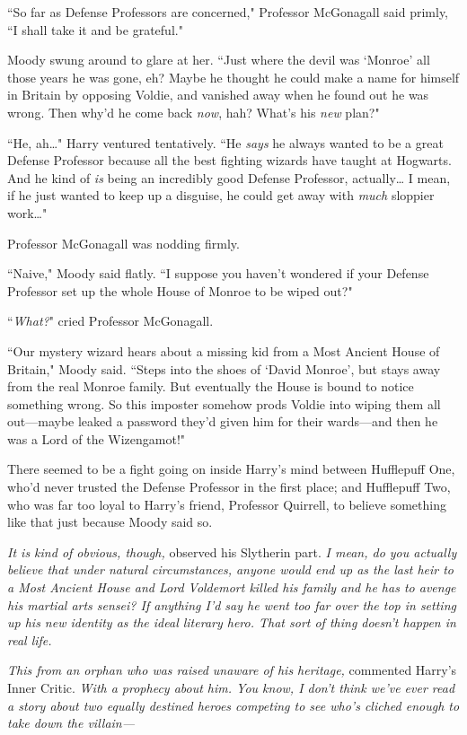 ``So far as Defense Professors are concerned," Professor McGonagall said primly, ``I shall take it and be grateful."

Moody swung around to glare at her. ``Just where the devil was `Monroe' all those years he was gone, eh? Maybe he thought he could make a name for himself in Britain by opposing Voldie, and vanished away when he found out he was wrong. Then why'd he come back \emph{now}, hah? What's his \emph{new} plan?"

``He, ah{\ldots}" Harry ventured tentatively. ``He \emph{says} he always wanted to be a great Defense Professor because all the best fighting wizards have taught at Hogwarts. And he kind of \emph{is} being an incredibly good Defense Professor, actually{\ldots} I mean, if he just wanted to keep up a disguise, he could get away with \emph{much} sloppier work{\ldots}"

Professor McGonagall was nodding firmly.

``Naive," Moody said flatly. ``I suppose you haven't wondered if your Defense Professor set up the whole House of Monroe to be wiped out?"

``\emph{What?}" cried Professor McGonagall.

``Our mystery wizard hears about a missing kid from a Most Ancient House of Britain," Moody said. ``Steps into the shoes of `David Monroe', but stays away from the real Monroe family. But eventually the House is bound to notice something wrong. So this imposter somehow prods Voldie into wiping them all out—maybe leaked a password they'd given him for their wards—and then he was a Lord of the Wizengamot!"

There seemed to be a fight going on inside Harry's mind between Hufflepuff One, who'd never trusted the Defense Professor in the first place; and Hufflepuff Two, who was far too loyal to Harry's friend, Professor Quirrell, to believe something like that just because Moody said so.

\emph{It \emph{is} kind of obvious, though,} observed his Slytherin part. \emph{I mean, do you actually believe that under natural circumstances, anyone would end up as the last heir to a Most Ancient House \emph{and} Lord Voldemort killed his family \emph{and} he has to avenge his martial arts sensei? If anything I'd say he went too far over the top in setting up his new identity as the ideal literary hero. That sort of thing doesn't happen in real life.}

\emph{This from an orphan who was raised unaware of his heritage,} commented Harry's Inner Critic. \emph{With a prophecy about him. You know, I don't think we've ever read a story about two equally destined heroes competing to see who's cliched enough to take down the villain—}

